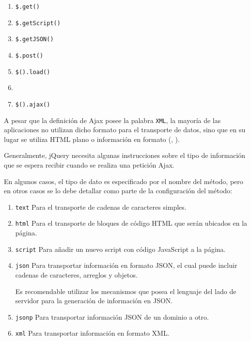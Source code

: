 \begin{enumerate}
\item \verb|$.get()|
\item \verb|$.getScript()|
\item \verb|$.getJSON()|
\item \verb|$.post()|
\item \verb|$().load()|
\item 
\item \verb|$().ajax()|
\end{enumerate}

A pesar que la definición de Ajax posee la palabra \verb|XML|, la
mayoría de las aplicaciones no utilizan dicho formato para el
transporte de datos, sino que en su lugar se utiliza HTML plano o
información en formato  (, ).

Generalmente, jQuery necesita algunas instrucciones sobre el tipo de información 
que se espera recibir cuando se realiza una petición Ajax. 

En algunos casos, el tipo de dato es especificado por el nombre del método, 
pero en otros casos se lo debe detallar como parte de la configuración del método:

\begin{enumerate}
\item 
\verb|text| Para el transporte de cadenas de caracteres simples.
\item 
\verb|html| Para el transporte de bloques de código HTML que serán ubicados en la página.
\item 
\verb|script| Para añadir un nuevo script con código JavaScript a la página.
\item 
\verb|json| Para transportar información en formato JSON, el cual puede incluir cadenas de caracteres, arreglos y objetos.

Es recomendable utilizar los mecanismos que posea el lenguaje del
lado de servidor para la generación de información en JSON.
\item 
\verb|jsonp| Para transportar información JSON de un dominio a otro. 
\item 
\verb|xml| Para transportar información en formato XML.
\end{enumerate}

